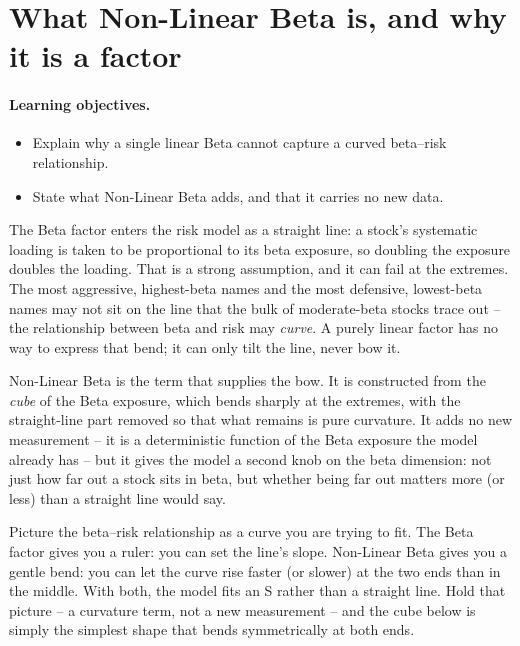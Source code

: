 \documentclass[11pt]{article}
\theoremstyle{definition}
\theoremstyle{plain}
\theoremstyle{remark}
\begin{document}
\tableofcontents
\bigskip

\section{What Non-Linear Beta is, and why it is a factor}\label{sec:what}

\paragraph{Learning objectives.}
\begin{itemize}[leftmargin=1.4em,topsep=2pt]
  \item Explain why a single linear Beta cannot capture a curved beta--risk relationship.
  \item State what Non-Linear Beta adds, and that it carries no new data.
\end{itemize}

The Beta factor enters the risk model as a straight line: a stock's systematic loading is taken to be proportional to its beta exposure, so doubling the exposure doubles the loading. That is a strong assumption, and it can fail at the extremes. The most aggressive, highest-beta names and the most defensive, lowest-beta names may not sit on the line that the bulk of moderate-beta stocks trace out -- the relationship between beta and risk may \emph{curve}. A purely linear factor has no way to express that bend; it can only tilt the line, never bow it.

Non-Linear Beta is the term that supplies the bow. It is constructed from the \emph{cube} of the Beta exposure, which bends sharply at the extremes, with the straight-line part removed so that what remains is pure curvature. It adds no new measurement -- it is a deterministic function of the Beta exposure the model already has -- but it gives the model a second knob on the beta dimension: not just how far out a stock sits in beta, but whether being far out matters more (or less) than a straight line would say.

\begin{intuition}
Picture the beta--risk relationship as a curve you are trying to fit. The Beta factor gives you a ruler: you can set the line's slope. Non-Linear Beta gives you a gentle bend: you can let the curve rise faster (or slower) at the two ends than in the middle. With both, the model fits an S rather than a straight line. Hold that picture -- a curvature term, not a new measurement -- and the cube below is simply the simplest shape that bends symmetrically at both ends.
\end{intuition}
\end{document}
